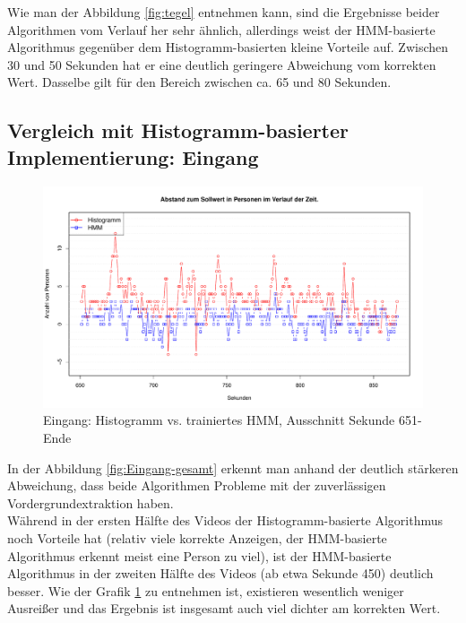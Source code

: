 Wie man der Abbildung \ref{fig:tegel} entnehmen kann, sind die Ergebnisse beider Algorithmen vom Verlauf her sehr ähnlich, allerdings weist der HMM-basierte Algorithmus gegenüber dem Histogramm-basierten kleine Vorteile auf.
Zwischen 30 und 50 Sekunden hat er eine deutlich geringere Abweichung vom korrekten Wert. Dasselbe gilt für den Bereich zwischen ca. 65 und 80 Sekunden.\\

\subsection{Vergleich mit Histogramm-basierter Implementierung: Eingang}
\label{sec:eval_eingang}

\begin{figure}
	\centering
	\includegraphics[width=1\textwidth {bilder/eingang2_histo_vs_hmm_prelearned.pdf}
	\caption{Eingang: Histogramm vs. trainiertes HMM (gesamt)}
	\label{fig:Eingang-gesamt}
\end{figure}

\begin{figure}
	\centering
	\includegraphics[width=1\textwidth]{bilder/safest_plot_histo_vs_prelearned_652-end.pdf}
	\caption{Eingang: Histogramm vs. trainiertes HMM, Ausschnitt Sekunde 651-Ende}
	\label{fig:Eingang-teil}
\end{figure}

In der Abbildung \ref{fig:Eingang-gesamt} erkennt man anhand der deutlich stärkeren Abweichung, dass beide Algorithmen Probleme mit der zuverlässigen Vordergrundextraktion haben.\\
Während in der ersten Hälfte des Videos der Histogramm-basierte Algorithmus noch Vorteile hat (relativ viele korrekte Anzeigen, der HMM-basierte Algorithmus erkennt meist eine Person zu viel), ist der HMM-basierte Algorithmus in der zweiten Hälfte des Videos (ab etwa Sekunde 450) deutlich besser. Wie der Grafik \ref{fig:Eingang-teil} zu entnehmen ist, existieren wesentlich weniger Ausreißer und das Ergebnis ist insgesamt auch viel dichter am korrekten Wert.\\


